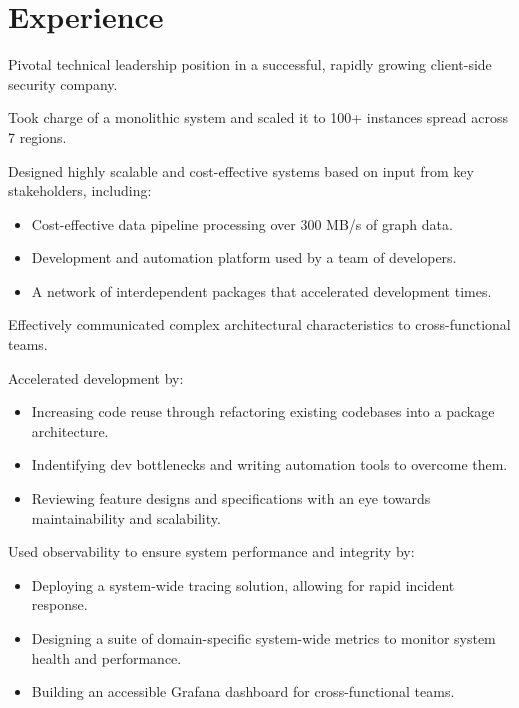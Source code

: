\documentclass[a4paper,11pt]{article}
\begin{document}
\header%
\section{Experience}
\begin{sectionList}

    \begin{jobReflectizLead}
        \item Pivotal technical leadership position in a successful, rapidly growing client-side security company.
        \item Took charge of a monolithic system and scaled it to 100+ instances spread across 7 regions.
        \item Designed highly scalable and cost-effective systems based on input from key stakeholders, including:
        \begin{itemize}
            \item Cost-effective data pipeline processing over 300 MB/s of graph data.
            \item Development and automation platform used by a team of developers.
            \item A network of interdependent packages that accelerated development times.
        \end{itemize}
        \item Effectively communicated complex architectural characteristics to cross-functional teams.
        \item Accelerated development by:
        \begin{itemize}
            \item Increasing code reuse through refactoring existing codebases into a package architecture.
            \item Indentifying dev bottlenecks and writing automation tools to overcome them.
            \item Reviewing feature designs and specifications with an eye towards maintainability and scalability.
        \end{itemize}
        \item Used observability to ensure system performance and integrity by:
        \begin{itemize}
            \item Deploying a system-wide tracing solution, allowing for rapid incident response.
            \item Designing a suite of domain-specific system-wide metrics to monitor system health and performance.
            \item Building an accessible Grafana dashboard for cross-functional teams.

\end{itemize}
\end{jobReflectizLead}
\end{sectionList}
\end{document}
